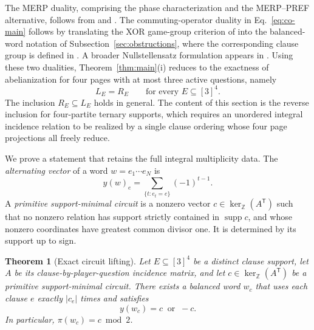 \documentclass[11pt]{article}
\newtheorem{theorem}{Theorem}[section]
\theoremstyle{definition}
\theoremstyle{remark}
\newcommand{\supp}{\operatorname{supp}}
\numberwithin{equation}{section}
\begin{document}
The MERP duality, comprising the phase characterization and the MERP--PREF
alternative, follows from \cite[Claim~5.29]{WattsHarrowKanwarNatarajan2019}
and \cite[Theorem~5.30]{WattsHarrowKanwarNatarajan2019}. The
commuting-operator duality in Eq.~\eqref{eq:co-main} follows by translating
the XOR game-group criterion of \cite[Theorem~2.1]{WattsHelton2023} into the
balanced-word notation of Subsection~\ref{sec:obstructions}, where the
corresponding clause group is defined in
\cite[Eq.~(2.9)]{WattsHelton2023}. A broader Nullstellensatz formulation
appears in \cite{WattsHeltonKlep2023}. Using these two dualities,
Theorem~\ref{thm:main}(i) reduces to the exactness of abelianization for four
pages with at most three active questions, namely
\begin{equation}\label{eq:central-target}
  L_E=R_E
  \qquad\text{for every }E\subseteq[3]^4.
\end{equation}
The inclusion \(R_E\subseteq L_E\) holds in general.  The content of this
section is the reverse inclusion for four-partite ternary supports, which
requires an unordered integral incidence relation to be realized by a single
clause ordering whose four page projections all freely reduce.

We prove a statement that retains the full integral multiplicity data.  The
\emph{alternating vector} of a word \(w=e_1\cdots e_N\) is
\[
  y(w)_e=\sum_{\{t:e_t=e\}}(-1)^{t-1}.
\]
A \emph{primitive support-minimal circuit} is a nonzero vector
\(c\in\ker_{\mathbb Z}(A^{\mathsf T})\) such that no nonzero relation has
support strictly contained in \(\supp c\), and whose nonzero coordinates have
greatest common divisor one.  It is determined by its support up to sign.

\begin{theorem}[Exact circuit lifting]\label{thm:exact-circuit-lifting}
Let \(E\subseteq[3]^4\) be a distinct clause support, let \(A\) be its
clause-by-player-question incidence matrix, and let
\(c\in\ker_{\mathbb Z}(A^{\mathsf T})\) be a primitive support-minimal
circuit.  There exists a balanced word \(w_c\) that uses each clause \(e\)
exactly \(\lvert c_e\rvert\) times and satisfies
\begin{equation}\label{eq:exact-circuit-lift}
  y(w_c)=c\ \text{ or }\ -c.
\end{equation}
In particular, \(\pi(w_c)=c\bmod2\).
\end{theorem}
\end{document}

